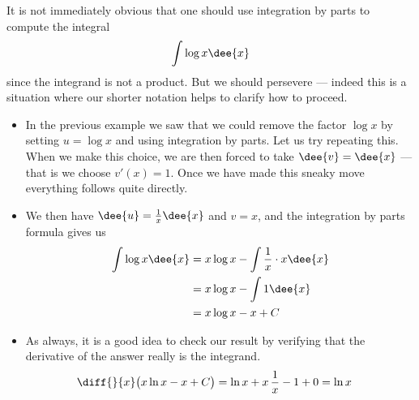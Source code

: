 \begin{eg}\label{eg:PRTSlnx}
It is not immediately obvious that one should use integration by parts to
compute the integral
\begin{align*}
  \int \log x \dee{x}
\end{align*}
since the integrand is not a product. But we should persevere --- indeed this
is a situation where our shorter notation helps to clarify how to proceed.

\soln
\begin{itemize}
 \item In the previous example we saw that we could remove the factor $\log x$ by
setting $u=\log x$ and using integration by parts. Let us try repeating
this. When we make this choice, we are then forced to take $\dee{v}=\dee{x}$
--- that is we choose $v'(x)=1$. Once we have made this sneaky move everything
follows quite directly.

\item We then have $\dee{u} = \frac{1}{x}\dee{x}$ and $v = x$, and the
integration by parts formula gives us
\begin{align*}
  \int \log x \dee{x}
  &= x \log x - \int \frac{1}{x} \cdot x \dee{x} \\
  &= x\log x - \int 1 \dee{x} \\
  &= x \log x - x + C
\end{align*}
\item As always, it is a good idea to check our result by verifying that the
derivative of the answer really is the integrand.
\begin{align*}
\diff{}{x} \big(x\ln x-x +C\big)
&= \ln x + x\,\frac{1}{x} -1+0
=\ln x
\end{align*}
\end{itemize}

\end{eg}


